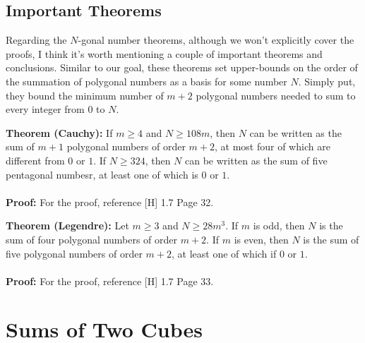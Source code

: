\documentclass[8pt]{extarticle}
\begin{document}
\subsection{Important Theorems}
Regarding the $N$-gonal number theorems, although we won't explicitly cover the proofs, I think it's worth mentioning a couple of important theorems and conclusions. Similar to our goal, these theorems set upper-bounds on the order of the summation of polygonal numbers as a basis for some number $N$. Simply put, they bound the minimum number of $m+2$ polygonal numbers needed to sum to every integer from $0$ to $N$. 
\begin{boxedsection}
    \textbf{Theorem (Cauchy):} If $m \geq 4$ and $N \geq 108m$, then $N$ can be written as the sum of $m+1$ polygonal numbers of order $m+2$, at most four of which are different from $0$ or $1$. If $N \geq 324$, then $N$ can be written as the sum of five pentagonal numbesr, at least one of which is $0$ or $1$. \\
    \\
    \textbf{Proof:} For the proof, reference [H] 1.7 Page 32.
\end{boxedsection}
\begin{boxedsection}
    \textbf{Theorem (Legendre):} Let $m \geq 3$ and $N \geq 28m^3$. If $m$ is odd, then $N$ is the sum of four polygonal numbers of order $m+2$. If $m$ is even, then $N$ is the sum of five polygonal numbers of order $m+2$, at least one of which if $0$ or $1$. \\
    \\
    \textbf{Proof:} For the proof, reference [H] 1.7 Page 33.
\end{boxedsection}

\pagebreak
\section{Sums of Two Cubes}
\end{document}
